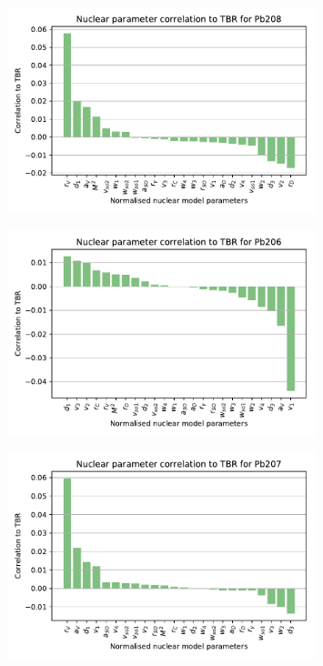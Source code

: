 \begin{figure}[H]
  \centering
	\includegraphics[width=0.8\textwidth]{Pb208_param_correl}
	\caption{}
	\label{fig:pb208_param_correl}
\end{figure}

\begin{figure}[H]
  \centering
	\includegraphics[width=0.8\textwidth]{Pb206_param_correl}
	\caption{}
	\label{fig:pb206_param_correl}
\end{figure}

\begin{figure}[H]
  \centering
	\includegraphics[width=0.8\textwidth]{Pb207_param_correl}
	\caption{}
	\label{fig:pb207_param_correl}
\end{figure}


